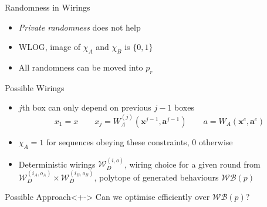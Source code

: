 \documentclass[xcolor=dvipsnames]{beamer}
\newcommand{\?}{\mathrel{?}} %
\newcommand{\cvec}[1]{\boldsymbol{\mathbf{#1}}}    %
\newcommand{\sW}{\mathcal{W}}
\newcommand{\sWB}{\mathcal{WB}}
\begin{document}
\begin{frame}{Randomness in Wirings}
  \begin{itemize}[<+->]
    \item \emph{Private randomness} does not help
    \item WLOG, image of \(\chi_A\) and \(\chi_B\) is \(\{0,1\}\)
    \item All randomness can be moved into \(p_r\)
  \end{itemize}
\end{frame}

\begin{frame}{Possible Wirings}
  \begin{itemize}[<+->]
    \item \(j\)th box can only depend on previous \(j-1\) boxes
    \[ x_1 = x \qquad x_j = W^{(j)}_A(\cvec{x}^{j-1}, \cvec{a}^{j-1}) \qquad
      a = W_A(\cvec{x}^{c}, \cvec{a}^{c}) \]
    \item \(\chi_A = 1\) for sequences obeying these constraints, \(0\) otherwise
    \item Deterministic wirings \(\sW_D^{(i,o)}\), wiring choice for a given round from \(\sW_D^{(i_A,o_A)} \times \sW_D^{(i_B,o_B)}\), polytope of generated behaviours \(\sWB(p)\)
  \end{itemize}

  \begin{block}{Possible Approach}<+->
    Can we optimise efficiently over \(\sWB(p)\)?
  \end{block}
\end{frame}
\end{document}
